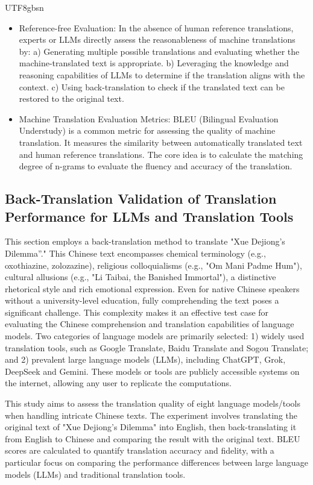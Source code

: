 \documentclass[conference]{IEEEtran}
\begin{document}
\begin{CJK*}{UTF8}{gbsn}
\begin{itemize}
 \item Reference-free Evaluation: In the absence of human reference translations, experts or LLMs directly assess the reasonableness of machine translations by: a) Generating multiple possible translations and evaluating whether the machine-translated text is appropriate. b) Leveraging the knowledge and reasoning capabilities of LLMs to determine if the translation aligns with the context. c) Using back-translation to check if the translated text can be restored to the original text.

 \item Machine Translation Evaluation Metrics: BLEU (Bilingual Evaluation Understudy) is a common metric for assessing the quality of machine translation. It measures the similarity between automatically translated text and human reference translations. The core idea is to calculate the matching degree of n-grams to evaluate the fluency and accuracy of the translation.

\end{itemize}

\subsection{Back-Translation Validation of Translation Performance for LLMs and Translation Tools}
This section employs a back-translation method to translate "Xue Dejiong’s Dilemma”." This Chinese text encompasses chemical terminology (e.g., oxothiazine, zolozazine), religious colloquialisms (e.g., "Om Mani Padme Hum"), cultural allusions (e.g., "Li Taibai, the Banished Immortal"), a distinctive rhetorical style and rich emotional expression. Even for native Chinese speakers without a university-level education, fully comprehending the text poses a significant challenge. This complexity makes it an effective test case for evaluating the Chinese comprehension and translation capabilities of language models. Two categories of language models are primarily selected: 1) widely used translation tools, such as Google Translate, Baidu Translate and Sogou Translate; and 2) prevalent large language models (LLMs), including ChatGPT, Grok, DeepSeek and Gemini. These models or tools are publicly accessible systems on the internet, allowing any user to replicate the computations.

This study aims to assess the translation quality of eight language models/tools when handling intricate Chinese texts. The experiment involves translating the original text of "Xue Dejiong’s Dilemma" into English, then back-translating it from English to Chinese and comparing the result with the original text. BLEU scores are calculated to quantify translation accuracy and fidelity, with a particular focus on comparing the performance differences between large language models (LLMs) and traditional translation tools.


\end{CJK*}
\end{document}
